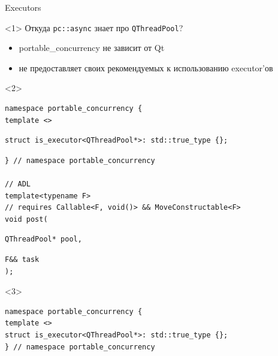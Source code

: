 \documentclass[aspectratio=169,hyperref={unicode},17pt]{beamer}
\begin{document}
\begin{frame}[fragile,t]{Executors}
\begin{onlyenv}<1>
Откуда \texttt{pc::async} знает про \texttt{QThreadPool}?
\begin{itemize}
 \item portable\_concurrency не зависит от Qt
 \item не предоставляет своих рекомендуемых к использованию executor'ов
\end{itemize}
\end{onlyenv}
\begin{onlyenv}<2>
\begin{lstlisting}[style=cppcode,aboveskip=0pt,belowskip=0pt]
namespace portable_concurrency {
template <>
\end{lstlisting}
\begin{lstlisting}[style=cppcode,backgroundcolor=\color{gray!30},aboveskip=0pt,belowskip=0pt]
struct is_executor<QThreadPool*>: std::true_type {};
\end{lstlisting}
\begin{lstlisting}[style=cppcode,aboveskip=0pt,belowskip=0pt]
} // namespace portable_concurrency

// ADL
template<typename F>
// requires Callable<F, void()> && MoveConstructable<F>
void post(
\end{lstlisting}
\begin{lstlisting}[style=cppcode,backgroundcolor=\color{gray!30},aboveskip=0pt,belowskip=0pt]
  QThreadPool* pool,
\end{lstlisting}
\begin{lstlisting}[style=cppcode,aboveskip=0pt,belowskip=0pt]
  F&& task
);
\end{lstlisting}
\end{onlyenv}
\begin{onlyenv}<3>
\begin{lstlisting}[style=cppcode,aboveskip=0pt,belowskip=0pt]
namespace portable_concurrency {
template <>
struct is_executor<QThreadPool*>: std::true_type {};
} // namespace portable_concurrency


\end{lstlisting}
\end{onlyenv}
\end{frame}
\end{document}
